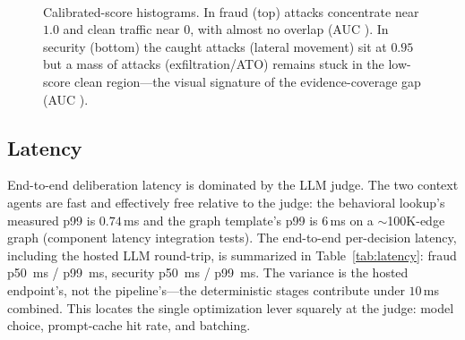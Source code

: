 \documentclass[sigconf,nonacm,screen]{acmart}
\begin{document}
\begin{figure}[t]
\centering
\\[2pt]
\caption{Calibrated-score histograms. In fraud (top) attacks concentrate near
$1.0$ and clean traffic near $0$, with almost no overlap (AUC \fraudauc). In
security (bottom) the caught attacks (lateral movement) sit at $0.95$ but a mass
of attacks (exfiltration/ATO) remains stuck in the low-score clean region---the
visual signature of the evidence-coverage gap (AUC \secauc).}
\label{fig:hist}
\end{figure}

\subsection{Latency}

End-to-end deliberation latency is dominated by the LLM judge. The two context
agents are fast and effectively free relative to the judge: the behavioral
lookup's measured p99 is $0.74$\,ms and the graph template's p99 is $6$\,ms on a
$\sim$100K-edge graph (component latency integration tests). The end-to-end
per-decision latency, including the hosted LLM round-trip, is summarized in
Table~\ref{tab:latency}: fraud p50 \fraudlatpfifty\,ms / p99 \fraudlatpninenine\,ms,
security p50 \seclatpfifty\,ms / p99 \seclatpninenine\,ms. The variance is the
hosted endpoint's, not the pipeline's---the deterministic stages contribute under
$10$\,ms combined. This locates the single optimization lever squarely at the
judge: model choice, prompt-cache hit rate, and batching.
\end{document}
